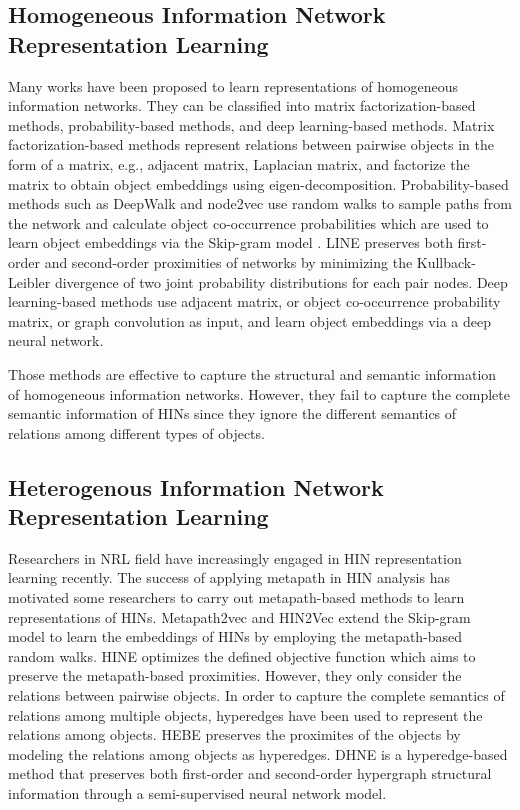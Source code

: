 \subsection{Homogeneous Information Network Representation Learning}
Many works have been proposed to learn representations of homogeneous information networks. They can be classified into matrix factorization-based methods, probability-based methods, and deep learning-based methods. Matrix factorization-based methods \cite{roweis2000nonlinear,belkin2002laplacian,ahmed2013distributed} represent relations between pairwise objects in the form of a matrix, e.g., adjacent matrix, Laplacian matrix, and factorize the matrix to obtain object embeddings using eigen-decomposition. Probability-based methods such as DeepWalk \cite{perozzi2014deepwalk} and node2vec \cite{grover2016node2vec} use random walks to sample paths from the network and calculate object co-occurrence probabilities which are used to learn object embeddings via the Skip-gram model \cite{mikolov2013efficient,mikolov2013distributed}. LINE \cite{tang2015line} preserves both first-order and second-order proximities of networks by minimizing the Kullback-Leibler divergence of two joint probability distributions for each pair nodes. Deep learning-based methods \cite{cao2016deep,wang2016structural,kipf2016semi} use adjacent matrix, or object co-occurrence probability matrix, or graph convolution as input, and learn object embeddings via a deep neural network.

Those methods are effective to capture the structural and semantic information of homogeneous information networks. However, they fail to capture the complete semantic information of HINs since they ignore the different semantics of relations among different types of objects.

\subsection{Heterogenous Information Network Representation Learning}
Researchers in NRL field have increasingly engaged in HIN representation learning recently. The success of applying metapath \cite{sun2011pathsim} in HIN analysis has motivated some researchers to carry out metapath-based methods to learn representations of HINs. Metapath2vec \cite{dong2017metapath2vec} and HIN2Vec \cite{fu2017hin2vec} extend the Skip-gram model to learn the embeddings of HINs by employing the metapath-based random walks. HINE \cite{huang2017heterogeneous} optimizes the defined objective function which aims to preserve the metapath-based proximities. However, they only consider the relations between pairwise objects. In order to capture the complete semantics of relations among multiple objects, hyperedges have been used to represent the relations among objects. HEBE \cite{gui2017embedding} preserves the proximites of the objects by modeling the relations among objects as hyperedges. DHNE \cite{tu2017structural} is a hyperedge-based method that preserves both first-order and second-order hypergraph structural information through a semi-supervised neural network model.

